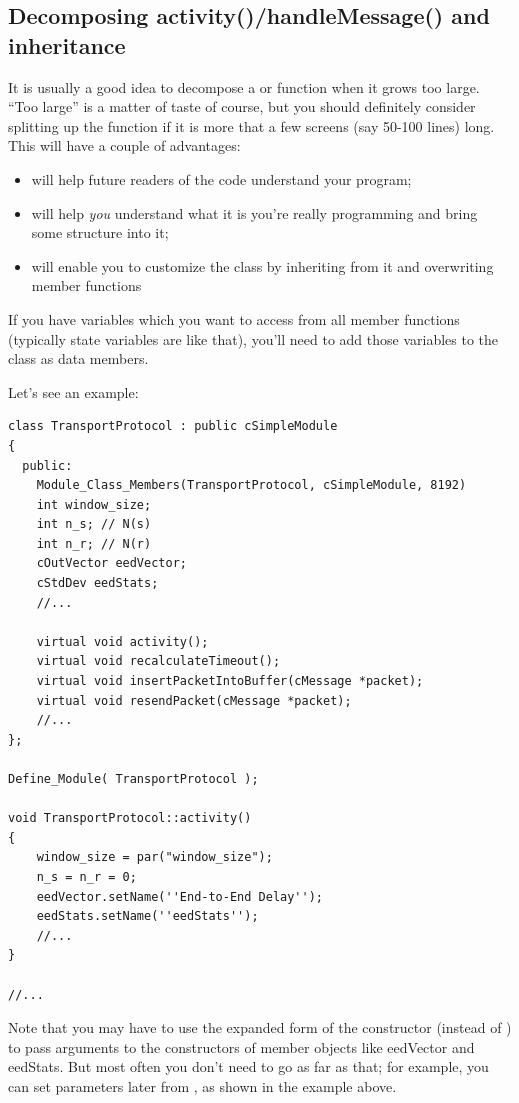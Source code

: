 \subsection{Decomposing activity()/handleMessage() and inheritance}

It is usually a good idea to decompose a  or
 function when it grows too large. ``Too
large'' is a matter of taste of course, but you should definitely
consider splitting up the function if it is more that a few screens
(say 50-100 lines) long. This will have a couple of advantages:
\begin{itemize}
\item{will help future readers of the code understand your program;}
\item{will help \textit{you} understand what it is you're really programming
and bring some structure into it;}
\item{will enable you to customize the class by inheriting from it and
    overwriting member functions}
\end{itemize}

If you have variables which you want to access from all member
functions (typically state variables are like that), you'll need to
add those variables to the class as data members.

Let's see an example:

\begin{verbatim}
class TransportProtocol : public cSimpleModule
{
  public:
    Module_Class_Members(TransportProtocol, cSimpleModule, 8192)
    int window_size;
    int n_s; // N(s)
    int n_r; // N(r)
    cOutVector eedVector;
    cStdDev eedStats;
    //...

    virtual void activity();
    virtual void recalculateTimeout();
    virtual void insertPacketIntoBuffer(cMessage *packet);
    virtual void resendPacket(cMessage *packet);
    //...
};

Define_Module( TransportProtocol );

void TransportProtocol::activity()
{
    window_size = par("window_size");
    n_s = n_r = 0;
    eedVector.setName(''End-to-End Delay'');
    eedStats.setName(''eedStats'');
    //...
}

//...
\end{verbatim}

\begin{sloppypar}
  Note that you may have to use the expanded form of the
  constructor (instead of
  ) to pass arguments to the constructors
  of member objects like eedVector and eedStats. But most often you
  don't need to go as far as that; for example, you can set parameters
  later from , as shown in the example above.
\end{sloppypar}

